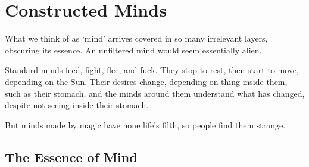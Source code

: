 \chapter{Constructed Minds}

What we think of as `mind' arrives covered in so many irrelevant layers, obscuring its essence.
An unfiltered mind would seem essentially alien.

Standard minds feed, fight, flee, and fuck.
They stop to rest, then start to move, depending on the Sun.
Their desires change, depending on thing inside them, such as their stomach, and the minds around them understand what has changed, despite not seeing inside their stomach.

But minds made by magic have none life's filth, so people find them strange.

\section{The Essence of Mind}


